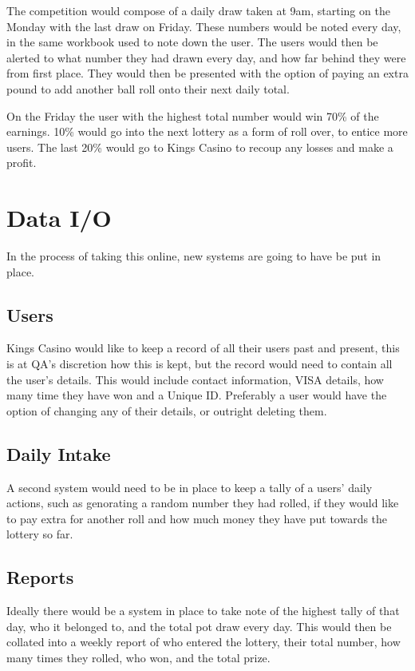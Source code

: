 \documentclass[12]{article}
\begin{document}
The competition would compose of a daily draw taken at 9am, starting on the Monday with the last draw on Friday. These numbers would be noted every day, in the same workbook used to note down the user. The users would then be alerted to what number they had drawn every day, and how far behind they were from first place. They would then be presented with the option of paying an extra pound to add another ball roll onto their next daily total. 

On the Friday the user with the highest total number would win 70\% of the earnings. 10\% would go into the next lottery as a form of roll over, to entice more users. The last 20\% would go to Kings Casino to recoup any losses and make a profit.

\section{Data I/O}

In the process of taking this online, new systems are going to have be put in place. 

\subsection{Users}
Kings Casino would like to keep a record of all their users past and present, this is at QA's discretion how this is kept, but the record would need to contain all the user's details. This would include contact information, VISA details, how many time they have won and a Unique ID. Preferably a user would have the option of changing any of their details, or outright deleting them.

\subsection{Daily Intake}
A second system would need to be in place to keep a tally of a users' daily actions, such as genorating a random number they had rolled, if they would like to pay extra for another roll and how much money they have put towards the lottery so far. 

\subsection{Reports}
Ideally there would be a system in place to take note of the highest tally of that day, who it belonged to, and the total pot draw every day. This would then be collated into a weekly report of who entered the lottery, their total number, how many times they rolled, who won, and the total prize.
\end{document}
